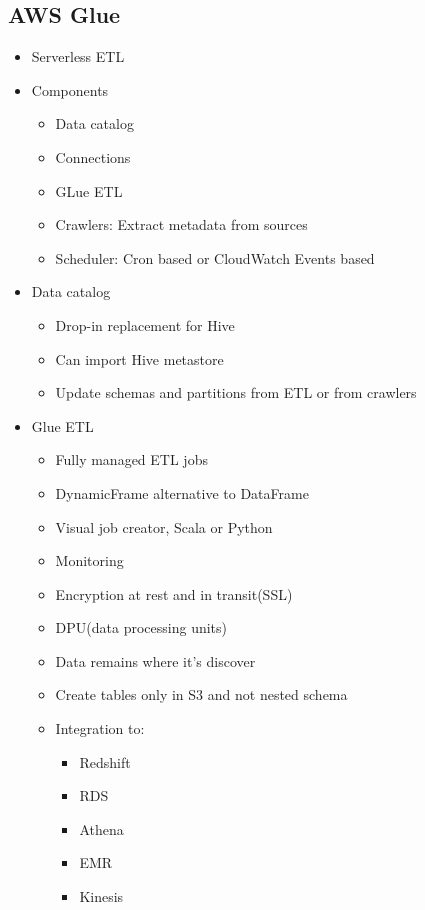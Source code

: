 \documentclass[../../main.tex]{subfiles}
\begin{document}
\subsection{AWS Glue}

\begin{itemize}
    \item Serverless ETL
    \item Components
    \begin{itemize}
        \item Data catalog
        \item Connections
        \item GLue ETL
        \item Crawlers: Extract metadata from sources
        \item Scheduler: Cron based or CloudWatch Events based
    \end{itemize}
    \item Data catalog
    \begin{itemize}
        \item Drop-in replacement for Hive
        \item Can import Hive metastore
        \item Update schemas and partitions from ETL or from crawlers
    \end{itemize}
    \item Glue ETL
    \begin{itemize}
        \item Fully managed ETL jobs
        \item DynamicFrame alternative to DataFrame
        \item Visual job creator, Scala or Python
        \item Monitoring
        \item Encryption at rest and in transit(SSL)
        \item DPU(data processing units)
        \item Data remains where it's discover
        \item Create tables only in S3 and not nested schema
        \item Integration to:
        \begin{itemize}
            \item Redshift
            \item RDS
            \item Athena
            \item EMR
            \item Kinesis

\end{itemize}
\end{itemize}
\end{itemize}
\end{document}
